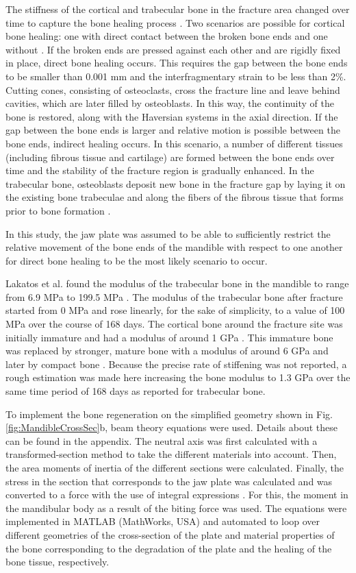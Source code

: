 The stiffness of the cortical and trabecular bone in the fracture area changed over time to capture the bone healing process \cite{Voss}. Two scenarios are possible for cortical bone healing: one with direct contact between the broken bone ends and one without \cite{Marsell}. If the broken ends are pressed against each other and are rigidly fixed in place, direct bone healing occurs. This requires the gap between the bone ends to be smaller than 0.001 mm and the interfragmentary strain to be less than 2\%. Cutting cones, consisting of osteoclasts, cross the fracture line and leave behind cavities, which are later filled by osteoblasts. In this way, the continuity of the bone is restored, along with the Haversian systems in the axial direction. If the gap between the bone ends is larger and relative motion is possible between the bone ends, indirect healing occurs. In this scenario, a number of different tissues (including fibrous tissue and cartilage) are formed between the bone ends over time and the stability of the fracture region is gradually enhanced. In the trabecular bone, osteoblasts deposit new bone in the fracture gap by laying it on the existing bone trabeculae and along the fibers of the fibrous tissue that forms prior to bone formation \cite{Voss}.

In this study, the jaw plate was assumed to be able to sufficiently restrict the relative movement of the bone ends of the mandible with respect to one another for direct bone healing to be the most likely scenario to occur.

Lakatos et al. found the modulus of the trabecular bone in the mandible to range from 6.9 MPa to 199.5 MPa \cite{Lakatos}. The modulus of the trabecular bone after fracture started from 0 MPa and rose linearly, for the sake of simplicity, to a value of 100 MPa over the course of 168 days. The cortical bone around the fracture site was initially immature and had a modulus of around 1 GPa \cite{Isaksson}. This immature bone was replaced by stronger, mature bone with a modulus of around 6 GPa and later by compact bone \cite{hawkeye}. Because the precise rate of stiffening was not reported, a rough estimation was made here increasing the bone modulus to 1.3 GPa over the same time period of 168 days as reported for trabecular bone.

To implement the bone regeneration on the simplified geometry shown in Fig. \ref{fig:MandibleCrossSec}b, beam theory equations were used. Details about these can be found in the appendix. The neutral axis was first calculated with a transformed-section method to take the different materials into account. Then, the area moments of inertia of the different sections were calculated. Finally, the stress in the section that corresponds to the jaw plate was calculated and was converted to a force with the use of integral expressions \cite{beamtheory}. For this, the moment in the mandibular body as a result of the biting force was used. The equations were implemented in MATLAB (MathWorks, USA) and automated to loop over different geometries of the cross-section of the plate and material properties of the bone corresponding to the degradation of the plate and the healing of the bone tissue, respectively.

